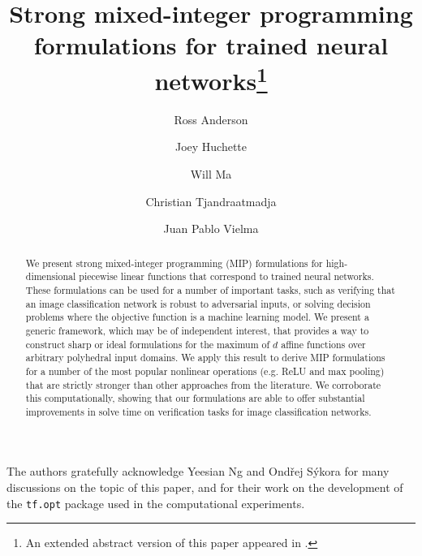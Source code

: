 \documentclass[smallextended]{svjour3}
\newcommand{\blue}[1]{{#1}}
\begin{document}
\title{Strong mixed-integer programming formulations for trained neural networks\footnote{\blue{An extended abstract version of this paper appeared in \cite{Anderson:2019}.}}}


\author{Ross Anderson \and Joey Huchette \and Will Ma \and Christian Tjandraatmadja \and Juan Pablo Vielma}


\maketitle

\begin{abstract}
We present strong mixed-integer programming (MIP) formulations for high-dimensional piecewise linear functions that correspond to trained neural networks. These formulations can be used for a number of important tasks, such as verifying that an image classification network is robust to adversarial inputs, or solving decision problems where the objective function is a machine learning model. We present a generic framework, which may be of independent interest, that provides a way to construct sharp or ideal formulations for the maximum of $d$ affine functions over arbitrary polyhedral input domains. We apply this result to derive MIP formulations for a number of the most popular nonlinear operations (e.g. ReLU and max pooling) that are strictly stronger than other approaches from the literature. We corroborate this computationally, showing that our formulations are able to offer substantial improvements in solve time on verification tasks for image classification networks.
\end{abstract}



\begin{acknowledgements}
The authors gratefully acknowledge Yeesian Ng and Ond\v{r}ej S\'{y}kora for many discussions on the topic of this paper, and for their work on the development of the \texttt{tf.opt} package used in the computational experiments.
\end{acknowledgements}
\end{document}

